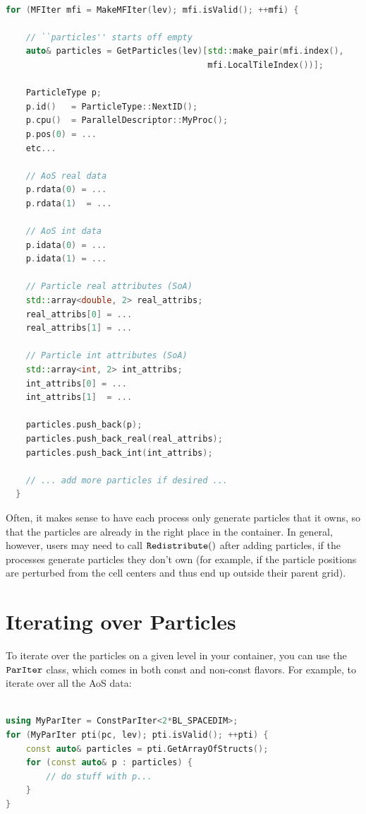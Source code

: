 \begin{lstlisting}[language=cpp]

for (MFIter mfi = MakeMFIter(lev); mfi.isValid(); ++mfi) {

    // ``particles'' starts off empty
    auto& particles = GetParticles(lev)[std::make_pair(mfi.index(),
                                        mfi.LocalTileIndex())];
 
    ParticleType p;
    p.id()   = ParticleType::NextID();
    p.cpu()  = ParallelDescriptor::MyProc();
    p.pos(0) = ...
    etc...

    // AoS real data
    p.rdata(0) = ...
    p.rdata(1)  = ...
         
    // AoS int data
    p.idata(0) = ...
    p.idata(1) = ...

    // Particle real attributes (SoA)
    std::array<double, 2> real_attribs;
    real_attribs[0] = ...
    real_attribs[1] = ...

    // Particle int attributes (SoA)
    std::array<int, 2> int_attribs;
    int_attribs[0] = ...
    int_attribs[1]  = ...
 
    particles.push_back(p);
    particles.push_back_real(real_attribs);
    particles.push_back_int(int_attribs);

    // ... add more particles if desired ...
  }

\end{lstlisting}

Often, it makes sense to have each process only generate particles that it owns, so that the particles are already in the right place in the container. 
In general, however, users may need to call $\tt{Redistribute()}$ after adding particles, if the processes generate particles they don't own (for example,
if the particle positions are perturbed from the cell centers and thus end up outside their parent grid).

\section{Iterating over Particles}
\label{sec:Particles:Iterating}

To iterate over the particles on a given level in your container, you can use the $\tt{ParIter}$ class, which comes in 
both const and non-const flavors. For example, to iterate over all the AoS data:

\begin{lstlisting}[language=cpp]

using MyParIter = ConstParIter<2*BL_SPACEDIM>;
for (MyParIter pti(pc, lev); pti.isValid(); ++pti) {
    const auto& particles = pti.GetArrayOfStructs();
    for (const auto& p : particles) {
        // do stuff with p...
    }
}
\end{lstlisting}

